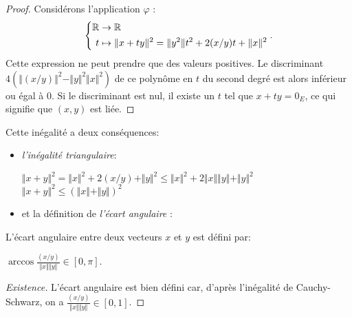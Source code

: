 \begin{proof}
Considérons l'application  $\varphi$ :
\begin{displaymath}
 \left\lbrace 
\begin{aligned}
 \mathbb{R} & \rightarrow  \mathbb{R} \\
 t & \mapsto   \Vert x + ty \Vert ^2 =  \Vert y^2 \Vert  t^2 + 2 (x/y) t +  \Vert  x  \Vert ^2
\end{aligned}
\right. .
\end{displaymath}
Cette expression ne peut prendre que des valeurs positives. Le discriminant $4(  \Vert (x/y) \Vert ^2 -  \Vert y \Vert ^2 \Vert x \Vert ^2 )$ de ce polynôme en $t$ du second degré est alors inférieur ou égal à 0.\newline
Si le discriminant est nul, il existe un $t$ tel que $x+ty = 0_E$, ce qui signifie que $(x,y)$ est liée.
\end{proof}
Cette inégalité a deux conséquences:
\begin{itemize} 
\item \emph{l'inégalité triangulaire}:
\begin{center}
$ \Vert  x + y \Vert ^2 =  \Vert x \Vert ^2 + 2(x/y) +  \Vert y \Vert ^2 \leq  \Vert x \Vert ^2 + 2  \Vert x \Vert   \Vert y \Vert  +  \Vert y \Vert ^2$ \\
$ \Vert x+y \Vert ^2 \leq ( \Vert x \Vert  +  \Vert y \Vert )^2$
\end{center}
\item et la définition de \emph{l'écart angulaire} :
\end{itemize}
\newpage
\begin{defi}
L'écart angulaire entre deux vecteurs $x$ et $y$ est défini par:
\begin{center}
$\arccos \displaystyle \frac{ (x/y) }{  \Vert x \Vert   \Vert y \Vert  } \in [0, \pi]$.
\end{center}
\end{defi}
\begin{proof}[Existence]
L'écart angulaire est bien défini car, d'après l'inégalité de Cauchy-Schwarz, on a $\frac{ (x/y) }{  \Vert x \Vert   \Vert y \Vert  } \in [0,1]$.
\end{proof}
\newpage
